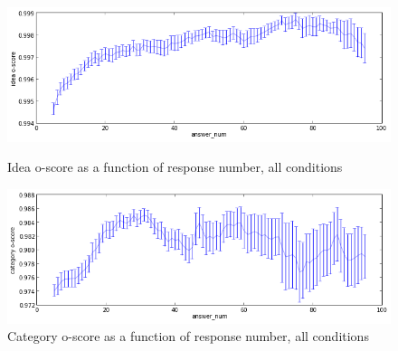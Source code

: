


\begin{figure}[h]
    \centering
    \includegraphics[width=0.9\columnwidth]{idea_oscore_order}
    \caption{Idea o-score as a function of response number, all conditions}
    \label{fig:idea_oscore_order}
    \includegraphics[width=0.9\columnwidth]{cat_oscore_order}
    \caption{Category o-score as a function of response number, all conditions}
    \label{fig:cat_oscore_order}
\end{figure}

